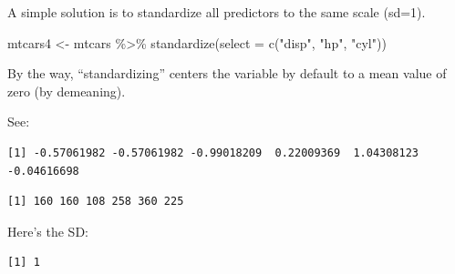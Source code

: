\documentclass[
  letterpaper,
  DIV=11,
  numbers=noendperiod]{scrreprt}
\newenvironment{Shaded}{\begin{snugshade}}{\end{snugshade}}
\newcommand{\AttributeTok}[1]{\textcolor[rgb]{0.40,0.45,0.13}{#1}}
\newcommand{\FunctionTok}[1]{\textcolor[rgb]{0.28,0.35,0.67}{#1}}
\newcommand{\NormalTok}[1]{\textcolor[rgb]{0.00,0.23,0.31}{#1}}
\newcommand{\OtherTok}[1]{\textcolor[rgb]{0.00,0.23,0.31}{#1}}
\newcommand{\SpecialCharTok}[1]{\textcolor[rgb]{0.37,0.37,0.37}{#1}}
\newcommand{\StringTok}[1]{\textcolor[rgb]{0.13,0.47,0.30}{#1}}
\theoremstyle{definition}
\theoremstyle{definition}
\theoremstyle{remark}
\begin{document}
A simple solution is to standardize all predictors to the same scale
(sd=1).

\begin{Shaded}
\begin{Highlighting}[]
\NormalTok{mtcars4 }\OtherTok{\textless{}{-}}
\NormalTok{  mtcars }\SpecialCharTok{\%\textgreater{}\%} 
  \FunctionTok{standardize}\NormalTok{(}\AttributeTok{select =} \FunctionTok{c}\NormalTok{(}\StringTok{"disp"}\NormalTok{, }\StringTok{"hp"}\NormalTok{, }\StringTok{"cyl"}\NormalTok{))}
\end{Highlighting}
\end{Shaded}

By the way, ``standardizing'' centers the variable by default to a mean
value of zero (by demeaning).

See:

\begin{Shaded}
\end{Shaded}

\begin{verbatim}
[1] -0.57061982 -0.57061982 -0.99018209  0.22009369  1.04308123 -0.04616698
\end{verbatim}

\begin{Shaded}
\end{Shaded}

\begin{verbatim}
[1] 160 160 108 258 360 225
\end{verbatim}

Here's the SD:

\begin{Shaded}
\end{Shaded}

\begin{verbatim}
[1] 1
\end{verbatim}

\begin{Shaded}
\end{Shaded}
\end{document}
